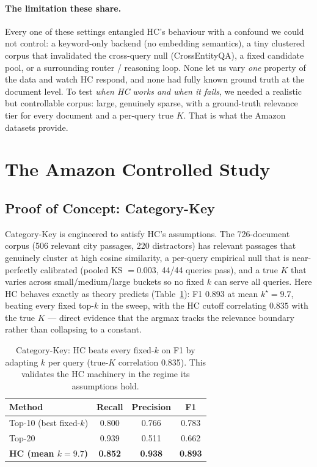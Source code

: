 \documentclass[letterpaper]{article}
\newcommand{\CatHCF}{0.893}
\newcommand{\CatHCR}{0.852}
\newcommand{\CatHCP}{0.938}
\newcommand{\CatHCK}{9.7}
\newcommand{\CatCorrK}{0.835}
\begin{document}
\paragraph{The limitation these share.}
Every one of these settings entangled HC's behaviour with a confound we
could not control: a keyword-only backend (no embedding semantics), a
tiny clustered corpus that invalidated the cross-query null
(CrossEntityQA), a fixed candidate pool, or a surrounding router /
reasoning loop. None let us vary \emph{one} property of the data and
watch HC respond, and none had fully known ground truth at the document
level. To test \emph{when HC works and when it fails}, we needed a
realistic but controllable corpus: large, genuinely sparse, with a
ground-truth relevance tier for every document and a per-query true $K$.
That is what the Amazon datasets provide.

\section{The Amazon Controlled Study}

\subsection{Proof of Concept: Category-Key}
Category-Key is engineered to satisfy HC's assumptions. The 726-document
corpus (506 relevant city passages, 220 distractors) has relevant
passages that genuinely cluster at high cosine similarity, a per-query
empirical null that is near-perfectly calibrated (pooled KS $=0.003$,
44/44 queries pass), and a true $K$ that varies across small/medium/large
buckets so no fixed $k$ can serve all queries. Here HC behaves exactly as
theory predicts (Table~\ref{tab:catkey}): F1 \CatHCF{} at mean
$k^\star=\CatHCK$, beating every fixed top-$k$ in the sweep, with the HC
cutoff correlating $\CatCorrK$ with the true $K$ --- direct evidence
that the argmax tracks the relevance boundary rather than collapsing to
a constant.

\begin{table}[t]
\centering
\small
\begin{tabular}{lccc}
\toprule
\textbf{Method} & \textbf{Recall} & \textbf{Precision} & \textbf{F1} \\
\midrule
Top-10 (best fixed-$k$) & 0.800 & 0.766 & 0.783 \\
Top-20                  & 0.939 & 0.511 & 0.662 \\
\midrule
\textbf{HC (mean $k\!=\!\CatHCK$)} & \textbf{\CatHCR} & \textbf{\CatHCP} & \textbf{\CatHCF} \\
\bottomrule
\end{tabular}
\caption{Category-Key: HC beats every fixed-$k$ on F1 by adapting $k$
per query (true-$K$ correlation \CatCorrK). This validates the HC
machinery in the regime its assumptions hold.}
\label{tab:catkey}
\end{table}
\end{document}
